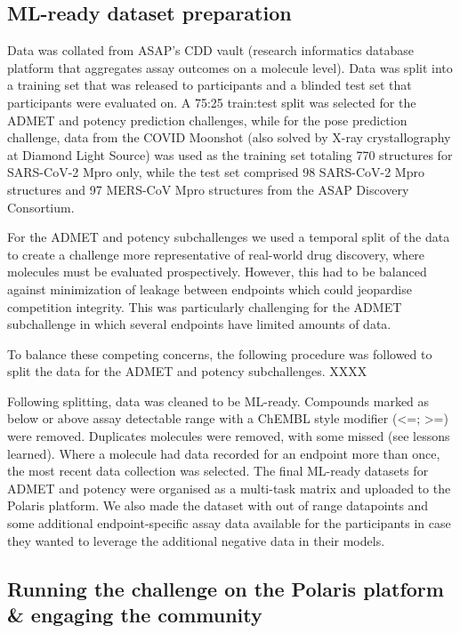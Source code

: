 \documentclass[journal=jacsat,manuscript=article]{achemso}
\begin{document}
\subsection{ML-ready dataset preparation}

Data was collated from ASAP’s CDD vault (research informatics database platform that aggregates assay outcomes on a molecule level).
Data was split into a training set that was released to participants and a blinded test set that participants were evaluated on. A 75:25 train:test split was selected for the ADMET and potency prediction challenges, while for the pose prediction challenge, data from the COVID Moonshot (also solved by X-ray crystallography at Diamond Light Source) was used as the training set totaling 770 structures for SARS-CoV-2 Mpro only, while the test set comprised 98 SARS-CoV-2 Mpro structures and 97 MERS-CoV Mpro structures from the ASAP Discovery Consortium.  

For the ADMET and potency subchallenges we used a temporal split of the data to create a challenge more  representative of real-world drug discovery, where molecules must be evaluated prospectively. However, this had to be balanced against minimization of leakage between endpoints which could jeopardise competition integrity. This was particularly challenging for the ADMET subchallenge in which several endpoints have 
limited amounts of data. 

To balance these competing concerns, the following procedure was followed to split the data for the ADMET and potency subchallenges.  XXXX

Following splitting, data was cleaned to be ML-ready. Compounds marked as below or above assay detectable range with a ChEMBL style modifier (\textless=; \textgreater=) were removed. Duplicates molecules were removed, with some missed (see lessons learned). Where a molecule had data recorded for an endpoint more than once, the most recent data collection was selected. The final ML-ready datasets for ADMET and potency were organised as a multi-task matrix and uploaded to the Polaris platform. We also made the dataset with out of range datapoints and some additional endpoint-specific assay data available for the participants in case they wanted to leverage the additional negative data in their models.  



\subsection{Running the challenge on the Polaris platform \& engaging the community}
\end{document}

